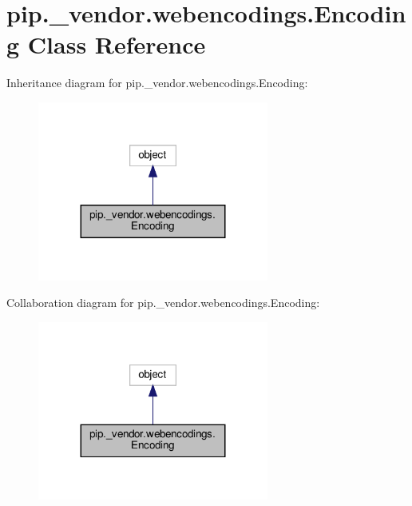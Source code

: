 \hypertarget{classpip_1_1__vendor_1_1webencodings_1_1Encoding}{}\section{pip.\+\_\+vendor.\+webencodings.\+Encoding Class Reference}
\label{classpip_1_1__vendor_1_1webencodings_1_1Encoding}


Inheritance diagram for pip.\+\_\+vendor.\+webencodings.\+Encoding\+:
\nopagebreak
\begin{figure}[H]
\begin{center}
\leavevmode
\includegraphics[width=215pt]{classpip_1_1__vendor_1_1webencodings_1_1Encoding__inherit__graph}
\end{center}
\end{figure}


Collaboration diagram for pip.\+\_\+vendor.\+webencodings.\+Encoding\+:
\nopagebreak
\begin{figure}[H]
\begin{center}
\leavevmode
\includegraphics[width=215pt]{classpip_1_1__vendor_1_1webencodings_1_1Encoding__coll__graph}
\end{center}
\end{figure}
